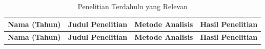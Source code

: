 {\scriptsize
    \setlength{\tabcolsep}{4pt}
    \renewcommand{\arraystretch}{1.10}
    \setlength{\LTleft}{0pt}
    \setlength{\LTright}{0pt}
    \setlength{\LTcapwidth}{\linewidth}
    \newlength{\PenelitianTerdahuluWidth}
    \setlength{\PenelitianTerdahuluWidth}{\dimexpr\linewidth-6\tabcolsep-3pt\relax}
    \begin{longtable}{@{}>{\raggedright\arraybackslash}p{0.14\PenelitianTerdahuluWidth}>{\raggedright\arraybackslash}p{0.30\PenelitianTerdahuluWidth}>{\raggedright\arraybackslash}p{0.18\PenelitianTerdahuluWidth}>{\raggedright\arraybackslash}p{0.38\PenelitianTerdahuluWidth}@{}}
        \caption{Penelitian Terdahulu yang Relevan}\label{tab:penelitian-terdahulu}                                                                                                                                                                                                                                                                                                                                                                                                                                                                                                                                                                             \\
        \toprule
        \textbf{Nama (Tahun)}                     & \textbf{Judul Penelitian}                                                                                                                                                            & \textbf{Metode Analisis}                                                                                                                       & \textbf{Hasil Penelitian}                                                                                                                                                                                                                                           \\
        \midrule
        \endfirsthead
        \toprule
        \textbf{Nama (Tahun)}                     & \textbf{Judul Penelitian}                                                                                                                                                            & \textbf{Metode Analisis}                                                                                                                       & \textbf{Hasil Penelitian}                                                                                                                                                                                                                                           \\

\end{longtable}}
